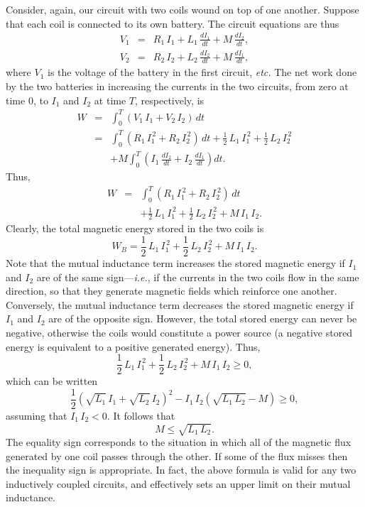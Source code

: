 Consider, again, our circuit with two coils wound on top of one another. Suppose that 
each coil is connected to its own battery. The circuit equations are thus
\begin{eqnarray}
V_1 &=& R_1\, I_1 + L_1\,\frac{d I_1}{dt} +M\,\frac{d I_2}{dt},\nonumber\\[0.5ex]
V_2 &=& R_2 \,I_2 + L_2\, \frac{d I_2}{d t} + M\,\frac{d I_1}{dt},
\end{eqnarray}
where $V_1$ is the voltage of the battery in the first circuit, {\em etc.} 
The net work done by the two batteries in increasing the currents in the two circuits,
from zero at time 0, to $I_1$ and $I_2$ at time $T$, respectively, is
\begin{eqnarray}
W &=& \int_0^T (V_1\, I_1 + V_2 \,I_2 )\,dt\nonumber\\[0.5ex]
&=& \int_0^T (R_1 \,I_1^{\,2} + R_2 \,I_2^{\,2})\,dt +\frac{1}{2}\, L_1 \,I_1^{\,2}
+ \frac{1}{2}\, L_2 \,I_2^{\,2}\nonumber\\[0.5ex]
&& + M \int_0^T \left(I_1\, \frac{dI_2}{dt}  + I_2\,\frac{d I_1}{dt } \right)dt.
\end{eqnarray}
Thus, 
\begin{eqnarray}
W &=& \int_0^T (R_1 \,I_1^{\,2} + R_2\, I_2^{\,2} )\,dt\nonumber\\[0.5ex]
&& + \frac{1}{2} \,L_1 \,I_1^{\,2} + \frac{1}{2}\, L_2 \,I_2^{\,2} + M\, I_1\, I_2.
\end{eqnarray}
Clearly, the total magnetic energy stored in the two coils is
\begin{equation} 
W_B =  \frac{1}{2}\, L_1\, I_1^{\,2} + \frac{1}{2} \,L_2 \,I_2^{\,2} + M \,I_1 \,I_2.
\end{equation}
Note that the mutual inductance term increases the stored magnetic energy if $I_1$ and
$I_2$ are of the same sign---{\em i.e.}, if the currents in the  two coils flow
in the same direction, so that they generate magnetic fields which reinforce
one another. Conversely, the mutual inductance term decreases the stored 
magnetic energy if $I_1$ and $I_2$ are of the opposite sign. However, the total 
stored energy can never be negative, otherwise the coils
would constitute a power source (a negative stored energy is equivalent to
a positive generated energy). Thus,
\begin{equation} 
\frac{1}{2}\, L_1 \,I_1^{\,2} + \frac{1}{2}\, L_2 \,I_2^{\,2} + M\, I_1 \,I_2\geq 0,
\end{equation}
which can be written
\begin{equation}
\frac{1}{2}\left( \sqrt{L_1} \,I_1 + \sqrt{L_2}\,I_2\right)^2 - I_1 \,I_2 (\sqrt{L_1 \,L_2}
-M) \geq 0,
\end{equation}
assuming that $I_1\, I_2 <0$. It follows that
\begin{equation}
M \leq \sqrt{L_1 \,L_2}.
\end{equation}
The equality sign corresponds to the situation in which
all of the magnetic flux generated by one coil passes through the other. If some of
the flux misses then the inequality sign is appropriate. 
In fact, the above formula is valid 
for any two inductively coupled circuits, and effectively sets an upper limit
on their mutual inductance.

